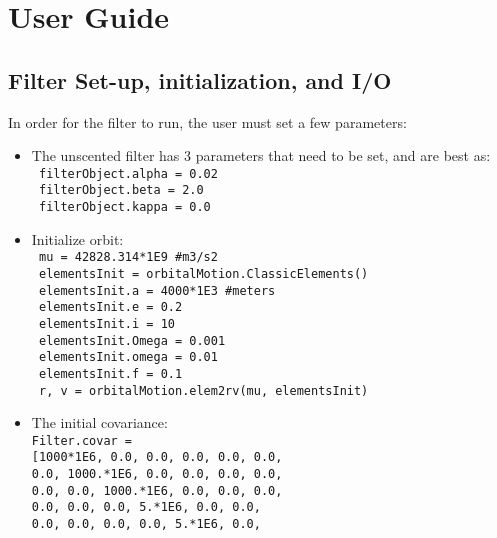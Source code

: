 
\section{User Guide}
\subsection{Filter Set-up, initialization, and I/O}

In order for the filter to run, the user must set a few parameters:

\begin{itemize}
\item The unscented filter has 3 parameters that need to be set, and are best as: \\
      \texttt{ filterObject.alpha = 0.02} \\
      \texttt{ filterObject.beta = 2.0} \\
      \texttt{ filterObject.kappa = 0.0} 
\item Initialize orbit: \\ 
\texttt{     mu = 42828.314*1E9 \#m3/s2} \\
 \texttt{    elementsInit = orbitalMotion.ClassicElements()} \\
 \texttt{    elementsInit.a = 4000*1E3 \#meters} \\
 \texttt{    elementsInit.e = 0.2} \\
 \texttt{    elementsInit.i = 10} \\
  \texttt{   elementsInit.Omega = 0.001} \\
 \texttt{    elementsInit.omega = 0.01} \\
 \texttt{    elementsInit.f = 0.1} \\
 \texttt{    r, v = orbitalMotion.elem2rv(mu, elementsInit)} 
\item The initial covariance: \\
 \texttt{Filter.covar =} \\
  \texttt{[1000*1E6, 0.0, 0.0, 0.0, 0.0, 0.0,\\
                              0.0, 1000.*1E6, 0.0, 0.0, 0.0, 0.0,\\
                              0.0, 0.0, 1000.*1E6, 0.0, 0.0, 0.0,\\
                              0.0, 0.0, 0.0, 5.*1E6, 0.0, 0.0,\\
                              0.0, 0.0, 0.0, 0.0, 5.*1E6, 0.0,\\
}
\end{itemize}
